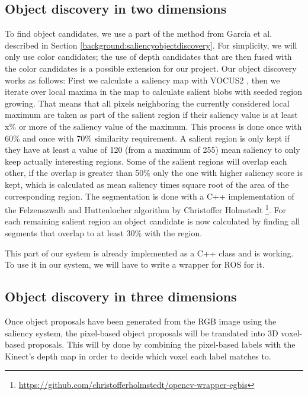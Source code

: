 \documentclass[a4paper,11pt,english]{article}
\begin{document}
\subsection{Object discovery in two dimensions}
\label{system:obj_discovery}
To find object candidates, we use a part of the method from García et al. described in Section \ref{background:saliencyobjectdiscovery}.
For simplicity, we will only use color candidates; the use of depth candidates that are then fused with the color candidates is a possible extension for our project.
Our object discovery works as follows: First we calculate a saliency map with VOCUS2 \cite{frintrop2015traditional}, then we iterate over local maxima in the map to calculate salient blobs with seeded region growing.
That means that all pixels neighboring the currently considered local maximum are taken as part of the salient region if their saliency value is at least x\% or more of the saliency value of the maximum.
This process is done once with 60\% and once with 70\% similarity requirement.
A salient region is only kept if they have at least a value of 120 (from a maximum of 255) mean saliency to only keep actually interesting regions.
Some of the salient regions will overlap each other, if the overlap is greater than 50\% only the one with higher saliency score is kept, which is calculated as mean saliency times square root of the area of the corresponding region.
The segmentation is done with a C++ implementation of the Felzenszwalb and Huttenlocher algorithm \cite{felzenszwalb2004efficient} by Christoffer Holmstedt \footnote{\url{https://github.com/christofferholmstedt/opencv-wrapper-egbis}}.
For each remaining salient region an object candidate is now calculated by finding all segments that overlap to at least 30\% with the region.

This part of our system is already implemented as a C++ class and is working. To use it in our system, we will have to write a wrapper for ROS for it.

\subsection{Object discovery in three dimensions}
\label{system:fusion}
Once object proposals have been generated from the RGB image using the saliency system, the pixel-based object proposals will be translated into 3D voxel-based proposals.
This will by done by combining the pixel-based labels with the Kinect's depth map in order to decide which voxel each label matches to.
\end{document}
